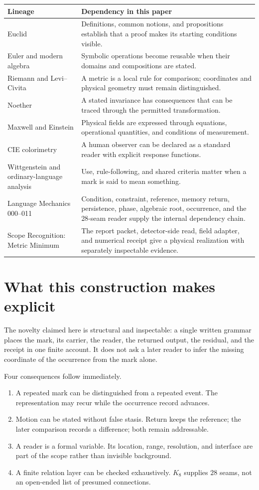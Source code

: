 \documentclass[11pt]{article}
\begin{document}
\begin{longtable}{p{}p{}}
\toprule
\textbf{Lineage} & \textbf{Dependency in this paper}\\
\midrule
\endhead
\bottomrule
\endfoot
Euclid & Definitions, common notions, and propositions establish that a proof makes its starting conditions visible.\\
Euler and modern algebra & Symbolic operations become reusable when their domains and compositions are stated.\\
Riemann and Levi--Civita & A metric is a local rule for comparison; coordinates and physical geometry must remain distinguished.\\
Noether & A stated invariance has consequences that can be traced through the permitted transformation.\\
Maxwell and Einstein & Physical fields are expressed through equations, operational quantities, and conditions of measurement.\\
CIE colorimetry & A human observer can be declared as a standard reader with explicit response functions.\\
Wittgenstein and ordinary-language analysis & Use, rule-following, and shared criteria matter when a mark is said to mean something.\\
Language Mechanics 000--011 & Condition, constraint, reference, memory return, persistence, phase, algebraic root, occurrence, and the $28$-seam reader supply the internal dependency chain.\\
Scope Recognition: Metric Minimum & The report packet, detector-side read, field adapter, and numerical receipt give a physical realization with separately inspectable evidence.\\
\end{longtable}

\section{What this construction makes explicit}
The novelty claimed here is structural and inspectable: a single written grammar places the mark, its carrier, the reader, the returned output, the residual, and the receipt in one finite account. It does not ask a later reader to infer the missing coordinate of the occurrence from the mark alone.

Four consequences follow immediately.
\begin{enumerate}[leftmargin=1.8em,itemsep=.45em]
\item A repeated mark can be distinguished from a repeated event. The representation may recur while the occurrence record advances.
\item Motion can be stated without false stasis. Return keeps the reference; the later comparison records a difference; both remain addressable.
\item A reader is a formal variable. Its location, range, resolution, and interface are part of the scope rather than invisible background.
\item A finite relation layer can be checked exhaustively. $K_8$ supplies $28$ seams, not an open-ended list of presumed connections.
\end{enumerate}
\end{document}
